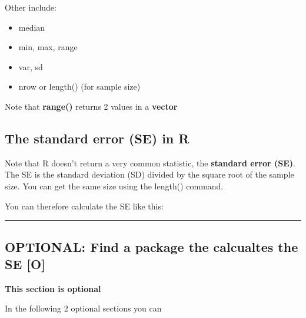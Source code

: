 \documentclass[]{book}
\newenvironment{Shaded}{\begin{snugshade}}{\end{snugshade}}
\newcommand{\KeywordTok}[1]{\textcolor[rgb]{0.13,0.29,0.53}{\textbf{#1}}}
\newcommand{\OperatorTok}[1]{\textcolor[rgb]{0.81,0.36,0.00}{\textbf{#1}}}
\newcommand{\NormalTok}[1]{#1}
\providecommand{\tightlist}{%
  \setlength{\itemsep}{0pt}\setlength{\parskip}{0pt}}
\theoremstyle{definition}
\theoremstyle{definition}
\theoremstyle{definition}
\theoremstyle{remark}
\begin{document}
Other include:

\begin{itemize}
\tightlist
\item
  median
\item
  min, max, range
\item
  var, sd
\item
  nrow or length() (for sample size)
\end{itemize}

Note that \textbf{range()} returns 2 values in a \textbf{vector}

\begin{Shaded}
\end{Shaded}

\subsection{The standard error (SE) in
R}\label{the-standard-error-se-in-r}

Note that R doesn't return a very common statistic, the \textbf{standard
error (SE)}. The SE is the standard deviation (SD) divided by the square
root of the sample size. You can get the same size using the length()
command.

You can therefore calculate the SE like this:

\begin{Shaded}
\end{Shaded}

\begin{center}\rule{0.5\linewidth}{\linethickness}\end{center}

\subsection{OPTIONAL: Find a package the calcualtes the SE
{[}O{]}}\label{optional-find-a-package-the-calcualtes-the-se-o}

\textbf{This section is optional}

In the following 2 optional sections you can
\end{document}
